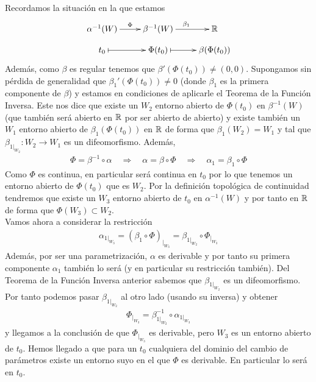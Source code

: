 \begin{ejemplo}
    Recordamos la situación en la que estamos
    \begin{gather*}
        \xymatrix@R=3mm{
            \alpha^{-1}(W) \ar[r]^{\Phi}  & \beta^{-1}(W) \ar[r]^{\beta_1} & \bb{R} \\
            t_0 \ar@{|->}[r] & \Phi(t_0) \ar@{|->}[r] & \beta(\Phi(t_0))
        }
    \end{gather*}
    Además, como $\beta$ es regular tenemos que $\beta'(\Phi(t_0)) \neq (0,0)$. Supongamos sin pérdida de generalidad que $\beta_1'(\Phi(t_0)) \neq 0$ (donde $\beta_1$ es la primera componente de $\beta$) y estamos en condiciones de aplicarle el Teorema de la Función Inversa. Este nos dice que existe un $W_2$ entorno abierto de $\Phi(t_0)$ en $\beta^{-1}(W)$ (que también será abierto en $\mathbb{R}$ por ser abierto de abierto) y existe también un $W_1$ entorno abierto de $\beta_1(\Phi(t_0))$ en $\mathbb{R}$ de forma que $\beta_1(W_2) = W_1$ y tal que $\beta_{1|_{W_2}} : W_2 \to W_1$ es un difeomorfismo. Además,
    \begin{gather*}
        \Phi = \beta^{-1}\circ \alpha \quad \Rightarrow \quad \alpha = \beta \circ \Phi \quad \Rightarrow \quad \alpha_1 = \beta_1 \circ \Phi
    \end{gather*}
    Como $\Phi$ es continua, en particular será continua en $t_0$ por lo que tenemos un entorno abierto de $\Phi(t_0)$ que es $W_2$. Por la definición topológica de continuidad tendremos que existe un $W_3$ entorno abierto de $t_0$ en $\alpha^{-1}(W)$ y por tanto en $\mathbb{R}$ de forma que $\Phi(W_3) \subset W_2$.\\

    Vamos ahora a considerar la restricción
    \begin{gather*}
        \alpha_{1|_{W_3}} = (\beta_1\circ \Phi)_{|_{W_3}} = \beta_{1|_{W_2}} \circ \Phi_{|_{W_3}}
    \end{gather*}
    Además, por ser una parametrización, $\alpha$ es derivable y por tanto su primera componente $\alpha_1$ también lo será (y en particular su restricción también). Del Teorema de la Función Inversa anterior sabemos que $\beta_{1|_{W_2}}$ es un difeomorfismo. Por tanto podemos pasar $\beta_{1|_{W_2}}$ al otro lado (usando su inversa) y obtener
    \begin{gather*}
        \Phi_{|_{W_3}} = \beta_{1|_{W_2}}^{-1} \circ \alpha_{1|_{W_3}}
    \end{gather*}
    y llegamos a la conclusión de que $\Phi_{|_{W_3}}$ es derivable, pero $W_3$ es un entorno abierto de $t_0$. Hemos llegado a que para un $t_0$ cualquiera del dominio del cambio de parámetros existe un entorno suyo en el que $\Phi$ es derivable. En particular lo será en $t_0$.
\end{ejemplo}

